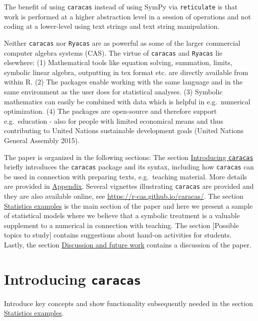 The benefit of using \texttt{caracas} instead of using SymPy via \texttt{reticulate}
is that work is performed at a higher abstraction level in a session of
operations and not coding at a lower-level using text strings and
text string manipulation.

Neither \texttt{caracas} nor \texttt{Ryacas} are as powerful as some
of the larger commercial computer algebra systems (CAS). The virtue of
\texttt{caracas} and \texttt{Ryacas} lie elsewhere:
(1) Mathematical tools like equation solving, summation, limits, symbolic linear
algebra, outputting in tex format etc. are directly available from
within R.
(2) The packages enable working with the same language and in the same
environment as the user does for statistical analyses.
(3) Symbolic mathematics can easily be combined with data which is
helpful in e.g.~numerical optimization.
(4) The packages are open-source and therefore support e.g.~education - also for people
with limited economical means and thus contributing to United
Nations sustainable development goals (United Nations General Assembly 2015).

The paper is organized in the following sections: The section
\protect\hyperlink{introducing-caracas}{Introducing \texttt{caracas}} briefly introduces
the \texttt{caracas} package and its syntax, including how \texttt{caracas} can be
used in connection with preparing texts, e.g.~teaching material. More
details are provided in \protect\hyperlink{appendix}{Appendix}.
Several vignettes illustrating \texttt{caracas} are provided and they are
also available online, see \url{https://r-cas.github.io/caracas/}. The
section \protect\hyperlink{statistics-examples}{Statistics examples} is the main section of the paper and
here we present a sample of statistical models where we believe that a
symbolic treatment is a valuable supplement to a numerical in
connection with teaching. The section {[}Possible topics to study{]}
contains suggestions about hand-on activities for students. Lastly,
the section \protect\hyperlink{discussion-and-future-work}{Discussion and future work} contains a discussion of the
paper.

\hypertarget{introducing-caracas}{%
\section{\texorpdfstring{Introducing \texttt{caracas}}{Introducing caracas}}\label{introducing-caracas}}

Introduce key concepts and show functionality subsequently needed in the section \protect\hyperlink{statistics-examples}{Statistics examples}.

